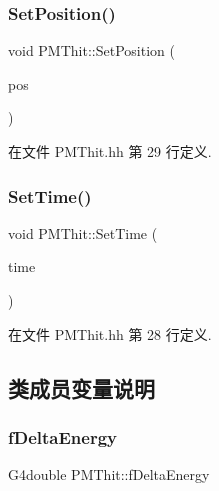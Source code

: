 \mbox{\label{classPMThit_a87350831c86e7d49a9ee6a656246ec34}} 
\subsubsection{\texorpdfstring{Set\+Position()}{SetPosition()}}
{\footnotesize\ttfamily void P\+M\+Thit\+::\+Set\+Position (\begin{DoxyParamCaption}\item[{G4\+Three\+Vector}]{pos }\end{DoxyParamCaption})\hspace{0.3cm}{\ttfamily [inline]}}



在文件 P\+M\+Thit.\+hh 第 29 行定义.

\mbox{\label{classPMThit_a44d1262d477540bbc7084b49e9ac7a9f}} 
\subsubsection{\texorpdfstring{Set\+Time()}{SetTime()}}
{\footnotesize\ttfamily void P\+M\+Thit\+::\+Set\+Time (\begin{DoxyParamCaption}\item[{G4double}]{time }\end{DoxyParamCaption})\hspace{0.3cm}{\ttfamily [inline]}}



在文件 P\+M\+Thit.\+hh 第 28 行定义.



\subsection{类成员变量说明}
\mbox{\label{classPMThit_ab7d4a0178488f853b786a2acce0fccde}} 
\subsubsection{\texorpdfstring{f\+Delta\+Energy}{fDeltaEnergy}}
{\footnotesize\ttfamily G4double P\+M\+Thit\+::f\+Delta\+Energy\hspace{0.3cm}{\ttfamily [private]}}



